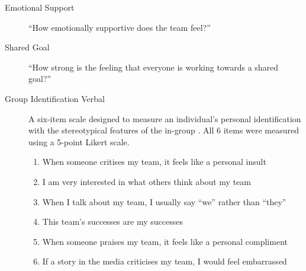 
  \begin{description}
    \item [Emotional Support] ``How emotionally supportive does the team feel?''
    \item [Shared Goal] ``How strong is the feeling that everyone is working towards a shared goal?''
    \item [Group Identification Verbal] A six-item scale designed to measure an individual's personal identification with the stereotypical features of the in-group  \citep{Mael1992}.  All 6 items were measured using a 5-point Likert scale.
          \begin{enumerate}
            \item When someone critises my team, it feels like a personal insult
            \item I am very interested in what others think about my team
            \item When I talk about my team, I usually say ``we'' rather than ``they''
            \item This team's successes are my successes
            \item When someone praises my team, it feels like a personal compliment
            \item If a story in the media criticises my team, I would feel embarrassed
          \end{enumerate}


\end{description}
